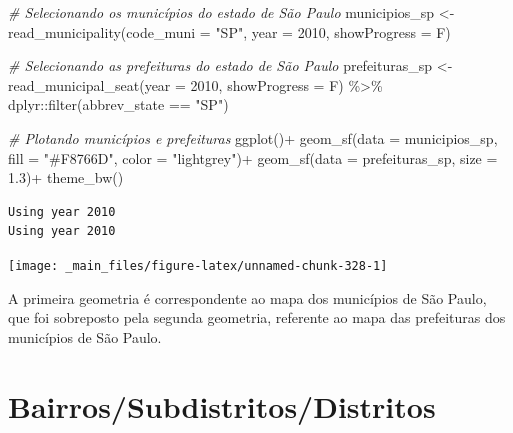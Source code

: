\documentclass[
  brazilian,
]{book}
\newenvironment{Shaded}{\begin{snugshade}}{\end{snugshade}}
\newcommand{\AttributeTok}[1]{\textcolor[rgb]{0.77,0.63,0.00}{#1}}
\newcommand{\CommentTok}[1]{\textcolor[rgb]{0.56,0.35,0.01}{\textit{#1}}}
\newcommand{\DecValTok}[1]{\textcolor[rgb]{0.00,0.00,0.81}{#1}}
\newcommand{\FloatTok}[1]{\textcolor[rgb]{0.00,0.00,0.81}{#1}}
\newcommand{\FunctionTok}[1]{\textcolor[rgb]{0.00,0.00,0.00}{#1}}
\newcommand{\NormalTok}[1]{#1}
\newcommand{\OtherTok}[1]{\textcolor[rgb]{0.56,0.35,0.01}{#1}}
\newcommand{\SpecialCharTok}[1]{\textcolor[rgb]{0.00,0.00,0.00}{#1}}
\newcommand{\StringTok}[1]{\textcolor[rgb]{0.31,0.60,0.02}{#1}}
\begin{document}
\begin{Shaded}
\begin{Highlighting}[]
\CommentTok{\# Selecionando os municípios do estado de São Paulo}
\NormalTok{municipios\_sp }\OtherTok{\textless{}{-}} \FunctionTok{read\_municipality}\NormalTok{(}\AttributeTok{code\_muni =} \StringTok{"SP"}\NormalTok{,}
                                   \AttributeTok{year =} \DecValTok{2010}\NormalTok{,}
                                   \AttributeTok{showProgress =}\NormalTok{ F)}


\CommentTok{\# Selecionando as prefeituras do estado de São Paulo}
\NormalTok{prefeituras\_sp }\OtherTok{\textless{}{-}} \FunctionTok{read\_municipal\_seat}\NormalTok{(}\AttributeTok{year =} \DecValTok{2010}\NormalTok{,}
                                      \AttributeTok{showProgress =}\NormalTok{ F) }\SpecialCharTok{\%\textgreater{}\%} 
\NormalTok{  dplyr}\SpecialCharTok{::}\FunctionTok{filter}\NormalTok{(abbrev\_state }\SpecialCharTok{==} \StringTok{"SP"}\NormalTok{)}


\CommentTok{\# Plotando municípios e prefeituras}
\FunctionTok{ggplot}\NormalTok{()}\SpecialCharTok{+}
  \FunctionTok{geom\_sf}\NormalTok{(}\AttributeTok{data =}\NormalTok{ municipios\_sp, }\AttributeTok{fill =} \StringTok{"\#F8766D"}\NormalTok{, }\AttributeTok{color =} \StringTok{"lightgrey"}\NormalTok{)}\SpecialCharTok{+}
  \FunctionTok{geom\_sf}\NormalTok{(}\AttributeTok{data =}\NormalTok{ prefeituras\_sp, }\AttributeTok{size =} \FloatTok{1.3}\NormalTok{)}\SpecialCharTok{+}
  \FunctionTok{theme\_bw}\NormalTok{()}
\end{Highlighting}
\end{Shaded}

\begin{verbatim}
Using year 2010
Using year 2010
\end{verbatim}

\begin{center}\texttt{[image: \_main\_files/figure-latex/unnamed-chunk-328-1]} \end{center}

A primeira geometria é correspondente ao mapa dos municípios de São Paulo, que foi sobreposto pela segunda geometria, referente ao mapa das prefeituras dos municípios de São Paulo.

\hypertarget{bairrossubdistritosdistritos}{%
\section{Bairros/Subdistritos/Distritos}\label{bairrossubdistritosdistritos}}
\end{document}
